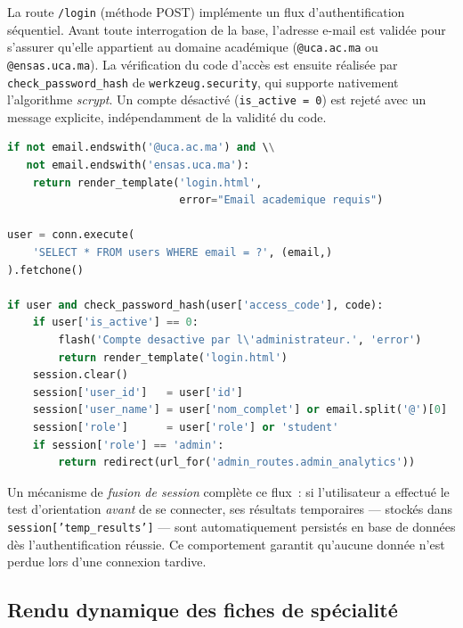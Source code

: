 \documentclass[a4paper,12pt]{article}
\begin{document}
La route \texttt{/login} (méthode POST) implémente un flux d'authentification
séquentiel. Avant toute interrogation de la base, l'adresse e-mail est validée
pour s'assurer qu'elle appartient au domaine académique (\texttt{@uca.ac.ma} ou
\texttt{@ensas.uca.ma}). La vérification du code d'accès est ensuite réalisée
par \texttt{check\_password\_hash} de \texttt{werkzeug.security}, qui supporte
nativement l'algorithme \textit{scrypt}. Un compte désactivé (\texttt{is\_active = 0})
est rejeté avec un message explicite, indépendamment de la validité du code.
\begin{lstlisting}[language=Python, caption={Flux d'authentification simplifié (main\_routes.py)}, captionpos=b]
if not email.endswith('@uca.ac.ma') and \\
   not email.endswith('ensas.uca.ma'):
    return render_template('login.html',
                           error="Email academique requis")

user = conn.execute(
    'SELECT * FROM users WHERE email = ?', (email,)
).fetchone()

if user and check_password_hash(user['access_code'], code):
    if user['is_active'] == 0:
        flash('Compte desactive par l\'administrateur.', 'error')
        return render_template('login.html')
    session.clear()
    session['user_id']   = user['id']
    session['user_name'] = user['nom_complet'] or email.split('@')[0]
    session['role']      = user['role'] or 'student'
    if session['role'] == 'admin':
        return redirect(url_for('admin_routes.admin_analytics'))
\end{lstlisting}

Un mécanisme de \textit{fusion de session} complète ce flux~: si l'utilisateur a
effectué le test d'orientation \emph{avant} de se connecter, ses résultats temporaires
--- stockés dans \texttt{session['temp\_results']} --- sont automatiquement persistés
en base de données dès l'authentification réussie. Ce comportement garantit qu'aucune
donnée n'est perdue lors d'une connexion tardive.

\subsection{Rendu dynamique des fiches de spécialité}
\end{document}
